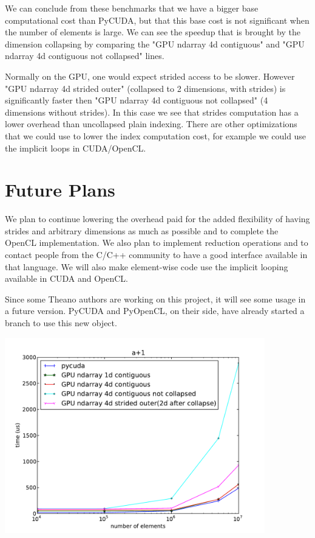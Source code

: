 \documentclass{article} %
\begin{document}
We can conclude from these benchmarks that we have a bigger base computational cost than PyCUDA, but that this base cost is not significant when the number of elements is large.
We can see the speedup that is brought by the dimension collapsing by comparing the "GPU ndarray 4d contiguous" and "GPU ndarray 4d contiguous not collapsed" lines.

Normally on the GPU, one would expect strided access to be slower.
However "GPU ndarray 4d strided outer" (collapsed to 2 dimensions, with strides) is significantly faster then "GPU ndarray 4d contiguous not collapsed" (4 dimensions without strides).
In this case we see that strides computation has a lower overhead than uncollapsed plain indexing.
There are other optimizations that we could use to lower the index computation cost, for example we could use the implicit loops in CUDA/OpenCL.


\section{Future Plans}

We plan to continue lowering the overhead paid for the added flexibility of having strides and arbitrary dimensions 
as much as possible and to complete the OpenCL implementation.
We also plan to implement reduction operations and to contact people from the C/C++ community to have a good interface available in that language.
We will also make element-wise code use the implicit looping available in CUDA and OpenCL.

Since some Theano authors are working on this project, it will see some usage in a future version. PyCUDA and PyOpenCL, on their side, have already started a branch to use this new object.

\includegraphics[width=0.85\textwidth]{ap1_no_alloc}
\end{document}
